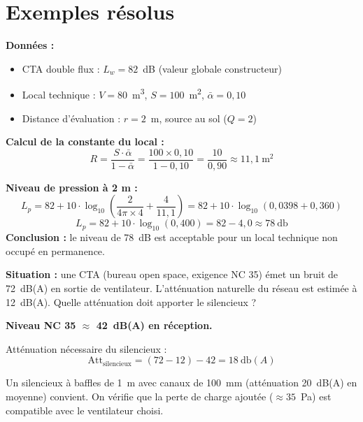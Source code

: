 \section{Exemples résolus}

\begin{exemple}[title={Calcul du niveau de pression dans un local technique}]
\textbf{Données :}
\begin{itemize}
  \item CTA double flux : $L_w = 82$~dB (valeur globale constructeur)
  \item Local technique : $V = 80$~\si{\metre\cubed}, $S = 100$~\si{\metre\squared}, $\bar{\alpha} = 0{,}10$
  \item Distance d'évaluation : $r = 2$~\si{\metre}, source au sol ($Q = 2$)
\end{itemize}

\textbf{Calcul de la constante du local :}
\[
  R = \frac{S \cdot \bar{\alpha}}{1 - \bar{\alpha}} = \frac{100 \times 0{,}10}{1 - 0{,}10} = \frac{10}{0{,}90} \approx 11{,}1~\si{\metre\squared}
\]

\textbf{Niveau de pression à 2 m :}
\[
  L_p = 82 + 10 \cdot \log_{10}\!\left(\frac{2}{4\pi \times 4} + \frac{4}{11{,}1}\right) = 82 + 10 \cdot \log_{10}(0{,}0398 + 0{,}360)
\]
\[
  L_p = 82 + 10 \cdot \log_{10}(0{,}400) = 82 - 4{,}0 \approx 78~\si{\decibel}
\]
\textbf{Conclusion :} le niveau de 78~dB est acceptable pour un local technique non occupé en permanence.
\end{exemple}

\begin{exemple}[title={Dimensionnement d'un silencieux}]
\textbf{Situation :} une CTA (bureau open space, exigence NC 35) émet un bruit de 72~dB(A) en sortie de ventilateur. L'atténuation naturelle du réseau est estimée à 12~dB(A). Quelle atténuation doit apporter le silencieux ?

\textbf{Niveau NC 35 $\approx$ 42~dB(A) en réception.}

Atténuation nécessaire du silencieux :
\[
  \text{Att}_{\text{silencieux}} = (72 - 12) - 42 = 18~\si{\decibel(A)}
\]

Un silencieux à baffles de 1~m avec canaux de 100~mm (atténuation 20~dB(A) en moyenne) convient. On vérifie que la perte de charge ajoutée ($\approx 35$~Pa) est compatible avec le ventilateur choisi.
\end{exemple}

